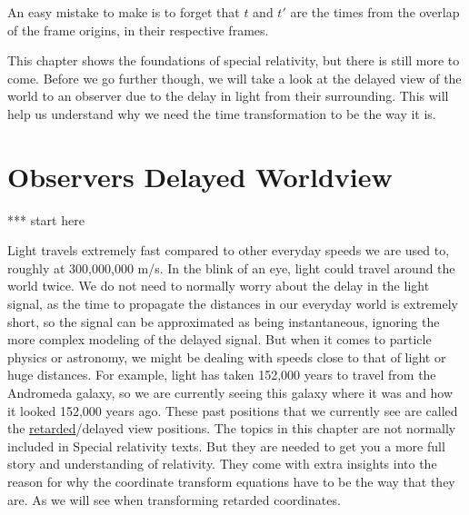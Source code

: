 An easy mistake to make is to forget that ${t}$ and ${t{'}}$ are the times from the overlap of the frame origins, in their respective frames.

This chapter shows the foundations of special relativity, but there is still more to come.
Before we go further though, we will take a look at the delayed view of the world to an observer due to the delay in light from their surrounding.
This will help us understand why we need the time transformation to be the way it is.



\printbibliography[segment=\therefsegment, heading=subbibliography]

\chapter{Observers Delayed Worldview} \label{ch: Observers Delayed Worldview}

*** start here

Light travels extremely fast compared to other everyday speeds we are used to, roughly at 300,000,000 m/s.
In the blink of an eye, light could travel around the world twice.
We do not need to normally worry about the delay in the light signal, as the time to propagate the distances in our everyday world is extremely short, so the signal can be approximated as being instantaneous, ignoring the more complex modeling of the delayed signal.
But when it comes to particle physics or astronomy, we might be dealing with speeds close to that of light or huge distances.
For example, light has taken 152,000 years to travel from the Andromeda galaxy, so we are currently seeing this galaxy where it was and how it looked 152,000 years ago.
These past positions that we currently see are called the \hyperlink{def-retarded-position}{retarded}/delayed view positions.
The topics in this chapter are not normally included in Special relativity texts.
But they are needed to get you a more full story and understanding of relativity.
They come with extra insights into the reason for why the coordinate transform equations have to be the way that they are.
As we will see when transforming retarded coordinates.


